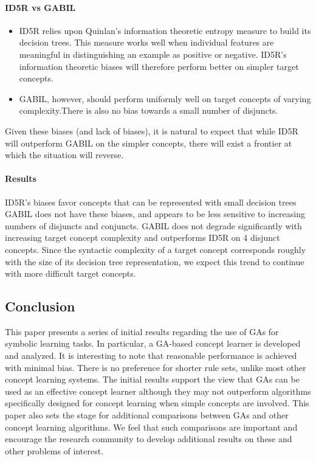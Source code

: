 \documentclass[../main.tex]{subfiles}
\begin{document}
\paragraph{ID5R vs GABIL}

\begin{itemize}
	\item ID5R relies upon Quinlan’s information theoretic entropy measure to build its decision trees. This measure
	works well when individual features are meaningful in distinguishing an example as positive or negative.  ID5R’s
	information theoretic biases will therefore perform better on simpler target concepts.
	\item GABIL, however, should perform uniformly well on target concepts of varying complexity.There is also no bias
	towards a small number of disjuncts.
\end{itemize}

Given these biases (and lack of biases), it is natural to expect that while ID5R will outperform GABIL on the simpler
concepts, there will exist a frontier at which the situation will reverse.

\paragraph{Results}

ID5R’s biases favor concepts that can be represented with small decision trees GABIL does not have these biases, and
appears to be less sensitive to increasing numbers of disjuncts and conjuncts. GABIL does not degrade significantly
with increasing target concept complexity and outperforms ID5R on 4 disjunct concepts. Since the syntactic complexity
of a target concept corresponds roughly with the size of its decision tree representation, we expect this trend to
continue with more difficult target concepts.

\subsection{Conclusion}

This paper presents a series of initial results regarding the use of GAs for symbolic learning tasks. In particular, a
GA-based concept learner is developed and analyzed. It is interesting to note that reasonable performance is achieved
with minimal bias. There is no preference for shorter rule sets, unlike most other concept learning systems. The
initial results support the view that GAs can be used as an effective concept learner although they may not outperform
algorithms specifically designed for concept learning when simple concepts are involved. This paper also sets the stage
for additional comparisons between GAs and other concept learning algorithms. We feel that such comparisons are
important and encourage the research community to develop additional results on these and other problems of interest.
\end{document}
